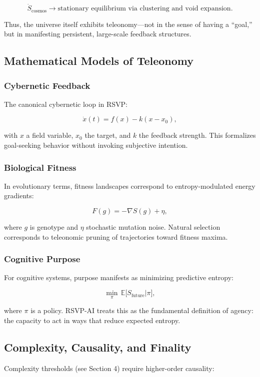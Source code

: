 \documentclass[12pt]{book}
\begin{document}
\[ \dot{S}_{\text{cosmos}} \to \text{stationary equilibrium via clustering and void expansion}. \]

Thus, the universe itself exhibits teleonomy—not in the sense of having a “goal,” but in manifesting persistent, large-scale feedback structures.

\subsection{Mathematical Models of Teleonomy}
\subsubsection{Cybernetic Feedback}
The canonical cybernetic loop in RSVP:

\[ \dot{x}(t) = f(x) - k(x - x_0), \]

with \( x \) a field variable, \( x_0 \) the target, and \( k \) the feedback strength. This formalizes goal-seeking behavior without invoking subjective intention.

\subsubsection{Biological Fitness}
In evolutionary terms, fitness landscapes correspond to entropy-modulated energy gradients:

\[ F(g) = - \nabla S(g) + \eta, \]

where \( g \) is genotype and \( \eta \) stochastic mutation noise. Natural selection corresponds to teleonomic pruning of trajectories toward fitness maxima.

\subsubsection{Cognitive Purpose}
For cognitive systems, purpose manifests as minimizing predictive entropy:

\[ \min_{\pi} \, \mathbb{E}\big[ S_{\text{future}} | \pi \big], \]

where \( \pi \) is a policy. RSVP-AI treats this as the fundamental definition of agency: the capacity to act in ways that reduce expected entropy.

\subsection{Complexity, Causality, and Finality}
Complexity thresholds (see Section 4) require higher-order causality:
\end{document}
